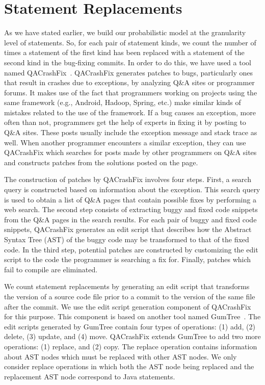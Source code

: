 
\section{Statement Replacements}

As we have stated earlier, we build our probabilistic model at the granularity level of statements.
So, for each pair of statement kinds, we count the number of times a statement of the first kind
has been replaced with a statement of the second kind in the bug-fixing commits. In order to do this, we have used a tool named QACrashFix~\cite{Gao2015}. QACrashFix generates patches to bugs, particularly ones that result in crashes due to exceptions, by analyzing Q\&A sites or programmer forums. It makes use of the fact that programmers working on projects using the same framework (e.g., Android, Hadoop, Spring, etc.) make similar kinds of mistakes related to the use of the framework. If a bug causes an exception, more often than not, programmers get the help of experts in fixing it by posting to Q\&A sites. These posts usually include the exception message and stack trace as well. When another programmer encounters a similar exception, they can use QACrashFix which searches for posts made by other programmers on Q\&A sites and constructs patches from the solutions posted on the page.

The construction of patches by QACrashFix involves four steps. First, a search query is constructed based on information about the exception. This search query is used to obtain a list of Q\&A pages that contain possible fixes by performing a web search. The second step consists of extracting buggy and fixed code snippets from the Q\&A pages in the search results. For each pair of buggy and fixed code snippets, QACrashFix generates an edit script that describes how the Abstract Syntax Tree (AST) of the buggy code may be transformed to that of the fixed code. In the third step, potential patches are constructed by customizing the edit script to the code the programmer is searching a fix for. Finally, patches which fail to compile are eliminated.

We count statement replacements by generating an edit script that transforms the version of a source code file prior to a commit to the version of the same file after the commit. We use the edit script generation component of QACrashFix for this purpose. This component is based on another tool named GumTree~\cite{Falleri2014}. The edit scripts generated by GumTree contain four types of operations: (1) add, (2) delete, (3) update, and (4) move. QACrashFix extends GumTree to add two more operations: (1) replace, and (2) copy. The replace operation contains information about AST nodes which must be replaced with other AST nodes. We only consider replace operations in which both the AST node being replaced and the replacement AST node correspond to Java statements.
